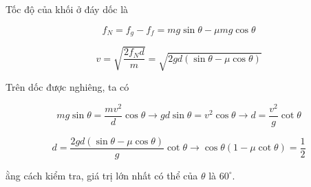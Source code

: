 \begin{solution}
Tốc độ của khối ở đáy dốc là

$$f_N = f_g - f_f = mg\sin\theta - \mu mg\cos\theta$$

$$v = \sqrt{\frac{2f_Nd}{m}} = \sqrt{2gd(\sin\theta-\mu\cos\theta)}$$

Trên dốc được nghiêng, ta có

$$mg\sin\theta = \frac{mv^2}{d}\cos\theta\longrightarrow gd\sin\theta = v^2\cos\theta\longrightarrow d = \frac{v^2}{g}\cot\theta$$

$$d = \frac{2gd(\sin\theta-\mu\cos\theta)}{g}\cot\theta\longrightarrow\cos\theta(1 - \mu\cot\theta) = \frac{1}{2}$$

ằng cách kiểm tra, giá trị lớn nhất có thể của $\theta$ là $\boxed{60^{\circ}}$.
\end{solution}
